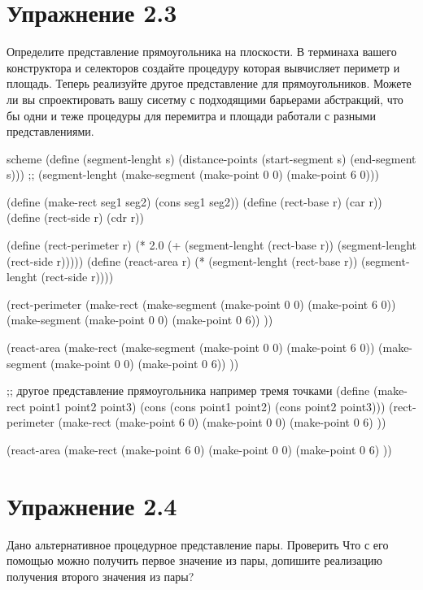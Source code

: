 \chapter{Упражнение 2.3}

Определите представление прямоугольника на плоскости. В терминаха вашего конструктора и селекторов создайте процедуру которая вывчисляет периметр и площадь. Теперь реализуйте другое представление для прямоугольников. Можете ли вы спроектировать вашу сисетму с подходящими барьерами абстракций, что бы одни и теже процедуры для перемитра и площади работали с разными представлениями.

\begin{codelisting}{scheme}
(define (segment-lenght s)
  (distance-points (start-segment s) (end-segment s)))
;; (segment-lenght (make-segment (make-point 0 0) (make-point 6 0)))

(define (make-rect seg1 seg2) (cons seg1 seg2))
(define (rect-base r) (car r))
(define (rect-side r) (cdr r))

(define (rect-perimeter r)
  (* 2.0 (+ (segment-lenght (rect-base r)) (segment-lenght (rect-side r)))))
(define (react-area r)
  (* (segment-lenght (rect-base r)) (segment-lenght (rect-side r))))

(rect-perimeter (make-rect
                 (make-segment (make-point 0 0) (make-point 6 0))
                 (make-segment (make-point 0 0) (make-point 0 6))
                 ))

(react-area (make-rect
                 (make-segment (make-point 0 0) (make-point 6 0))
                 (make-segment (make-point 0 0) (make-point 0 6))
                 ))


;; другое представление прямоугольника например тремя точками
(define (make-rect point1 point2 point3) (cons (cons point1 point2) (cons point2 point3)))
(rect-perimeter (make-rect
                 (make-point 6 0) (make-point 0 0) (make-point 0 6)
                 ))

(react-area (make-rect
             (make-point 6 0) (make-point 0 0) (make-point 0 6)
             ))
\end{codelisting}


\chapter{Упражнение 2.4}

Дано альтернативное процедурное представление пары. Проверить Что с его помощью можно получить первое значение из пары, допишите реализацию получения второго значения из пары?

